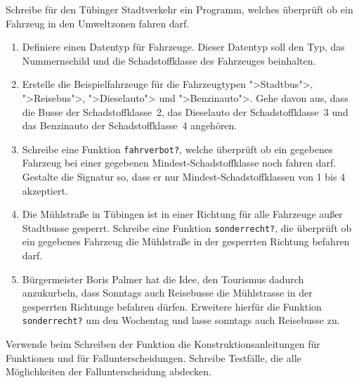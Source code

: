 \begin{aufgabe}

  Schreibe für den Tübinger Stadtverkehr ein
  Programm, welches überprüft ob ein Fahrzeug in den Umweltzonen fahren 
  darf.
  \begin{enumerate}
  \item Definiere einen Datentyp für Fahrzeuge. Dieser
    Datentyp soll den Typ, das Nummernschild und die Schadstoffklasse des
    Fahrzeuges beinhalten.
  \item Erstelle die Beispielfahrzeuge für die
    Fahrzeugtypen ">Stadtbus">, ">Reisebus">, ">Dieselauto">
    und ">Benzinauto">. Gehe davon aus, dass die Busse der
    Schadstoffklasse~2, das Dieselauto der Schadstoffklasse~3 und das
    Benzinauto der Schadstoffklasse~4 angehören.
  \item Schreibe eine Funktion \texttt{fahrverbot?},
    welche überprüft ob ein gegebenes Fahrzeug bei einer gegebenen
    Mindest-Schadstoffklasse noch fahren darf. Gestalte die Signatur
    so, dass er nur Mindest-Schadstoffklassen von 1 bis 4 akzeptiert.
  \item Die Mühlstraße in Tübingen ist in einer Richtung für
    alle Fahrzeuge außer Stadtbusse gesperrt. Schreibe eine Funktion
    \texttt{sonderrecht?}, die überprüft ob ein gegebenes Fahrzeug die
    Mühlstraße in der gesperrten Richtung befahren darf.  
  \item Bürgermeister Boris Palmer hat die Idee, den Tourismus
    dadurch anzukurbeln, dass Sonntags auch Reisebusse die Mühlstrasse in
    der gesperrten Richtunge befahren dürfen. Erweitere hierfür die
    Funktion \texttt{sonderrecht?} um den Wochentag und lasse sonntags
    auch Reisebusse zu.
  \end{enumerate}
  Verwende beim Schreiben der Funktion die
  Konstruktionsanleitungen für Funktionen und für Fallunterscheidungen. 
  Schreibe Testfälle, die alle Möglichkeiten der   
  Fallunterscheidung abdecken.
  
\end{aufgabe}

